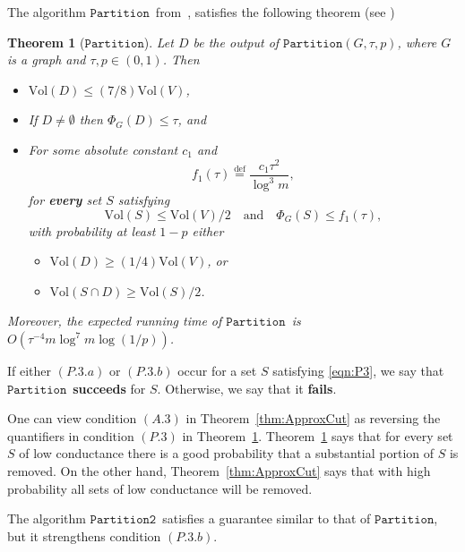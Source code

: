 \documentclass[11pt]{article}
\newtheorem{theorem}{Theorem}[section]
\newcommand{\partition}{\ensuremath{\mathtt{Partition}}}
\newcommand{\partitiontwo}{\ensuremath{\mathtt{Partition2}}}
\def\intersect{\cap}
\def\defeq{\stackrel{\mathrm{def}}{=}}
\def\intersect{\cap}
\def\vol#1{\mathrm{Vol}\left(#1  \right)}
\def\conduc#1#2{\Phi_{#1}\left(#2  \right)}
\begin{document}
The algorithm \partition\ from~\cite{SpielmanTengCuts},
  satisfies the following theorem (see \cite[Theorem 3.2]{SpielmanTengCuts})

\begin{theorem}[\partition]\label{thm:Partition}
Let $D$ be the output of $\partition (G, \tau , p)$,
  where $G$ is a graph and $\tau, p \in (0,1)$.
Then
\begin{itemize}
\item [(P.1)] $\vol{D} \leq (7/8) \vol{V}$,
\item [(P.2)] If $D \not = \emptyset$ then $\conduc{G}{D} \leq  \tau $, and
\item [(P.3)] For some absolute constant $c_{1}$ and
\[
  f_{1} (\tau) \defeq  \frac{c_{1} \tau^{2}}{\log^{3} m},
\]
for \textbf{every} set $S$ satisfying
\begin{equation}\label{eqn:P3}
\vol{S} \leq \vol{V}/2 \quad \text{and} \quad  \conduc{G}{S} \leq f_{1} (\tau),
\end{equation}
with probability at least $1-p$ either
\begin{itemize}
\item [(P.3.a)] $\vol{D} \geq (1/4) \vol{V}$, or
\item [(P.3.b)] $\vol{S \intersect D} \geq \vol{S}/2$.
\end{itemize}
\end{itemize}
Moreover, the expected running time of \partition \ is 
  $O \left(\tau^{-4}m \log^{7} m \log (1/p) \right) $.
\end{theorem}
If either $(P.3.a)$ or $(P.3.b)$ occur for a set
  $S$ satisfying \eqref{eqn:P3}, we say that \partition \
 \textbf{succeeds} for $S$.
Otherwise, we say that it \textbf{fails}.

One can view condition $(A.3)$ in Theorem~\ref{thm:ApproxCut} as reversing
  the quantifiers in condition $(P.3)$ in Theorem~\ref{thm:Partition}.
Theorem~\ref{thm:Partition} says that for every set $S$ of low conductance
  there is a good probability that a substantial portion of $S$ is removed.
On the other hand, Theorem~\ref{thm:ApproxCut} says that with high probability
  all sets of low conductance will be removed.

The algorithm \partitiontwo \ satisfies a guarantee similar to that of \partition,
  but it strengthens condition $(P.3.b)$.
\end{document}
